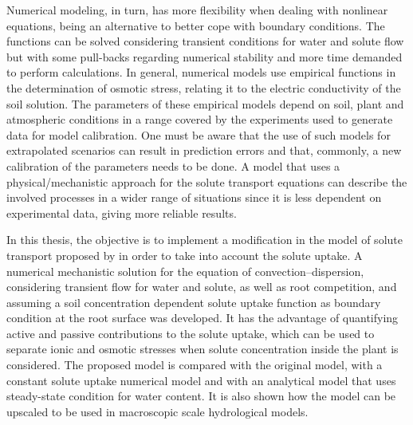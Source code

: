 Numerical modeling, in turn, has more flexibility when dealing with nonlinear equations, being an alternative to better cope with boundary conditions. 
The functions can be solved considering transient conditions for water and solute flow but with some pull-backs regarding numerical stability and more time demanded to perform calculations.
In general, numerical models use empirical functions in the determination of osmotic stress, relating it to the electric conductivity of the soil solution. 
The parameters of these empirical models depend on soil, plant and atmospheric conditions in a range covered by the experiments used to generate data for model calibration. 
One must be aware that the use of such models for extrapolated scenarios can result in prediction errors and that, commonly, a new calibration of the parameters needs to be done.
A model that uses a physical/mechanistic approach for the solute transport equations can describe the involved processes in a wider range of situations since it is less dependent on experimental data, giving more reliable results.


In this thesis, the objective is to 
implement a modification in the model of solute transport proposed by \citeonline[liersolute] in order to take into account the solute uptake.
A numerical mechanistic solution for the equation of convection--dispersion, considering transient flow for water and solute, as well as root competition, and assuming a soil concentration dependent solute uptake function as boundary condition at the root surface was developed.
It has the advantage of quantifying active and passive contributions to the solute uptake, which can be used to separate ionic and osmotic stresses when solute concentration inside the plant is considered. 
The proposed model is compared with 
the original model,
with a constant solute uptake numerical model and with an analytical model that uses steady-state condition for water content. 
It is also shown how the model can be upscaled to be used in macroscopic scale hydrological models.
